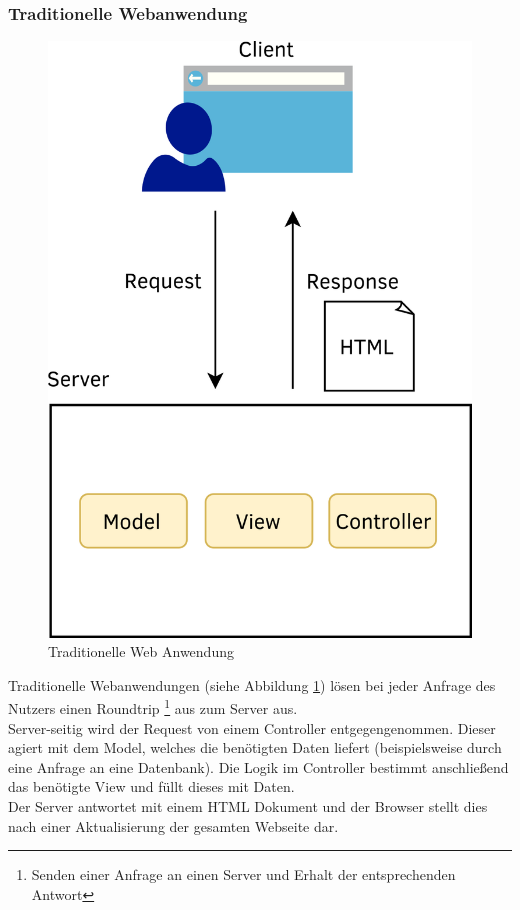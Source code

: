 \subsubsection{Traditionelle Webanwendung}
\begin{figure}
  \begin{center}
    \includegraphics[scale=1]{images/traditonal_web_app.png}
  \end{center}
  \caption{Traditionelle Web Anwendung}
  \label{fig:tradweb}
\end{figure}
Traditionelle Webanwendungen (siehe Abbildung \ref{fig:tradweb}) lösen bei jeder Anfrage des Nutzers einen Roundtrip \footnote{Senden einer Anfrage an einen Server und Erhalt der entsprechenden Antwort} aus zum Server aus.\\
Server-seitig wird der Request von einem Controller entgegengenommen. Dieser agiert mit dem Model, welches die benötigten Daten liefert (beispielsweise durch eine Anfrage an eine Datenbank). Die Logik im Controller bestimmt anschließend das benötigte View und füllt dieses mit Daten.\\
Der Server antwortet mit einem \ac{HTML} Dokument und der Browser stellt dies nach einer Aktualisierung der gesamten Webseite dar.
